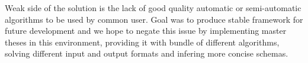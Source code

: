 \documentclass[a4paper,8pt,oneside,twocolumn]{article}
\begin{document}
Weak side of the solution is the lack of good quality automatic or semi-automatic algorithms to be used by common user.
Goal was to produce stable framework for future development and we hope to negate this issue by implementing master theses in this environment, providing it with bundle of different algorithms, solving different input and output formats and infering more concise schemas.

\nocite{*}
\newpage


\end{document}
